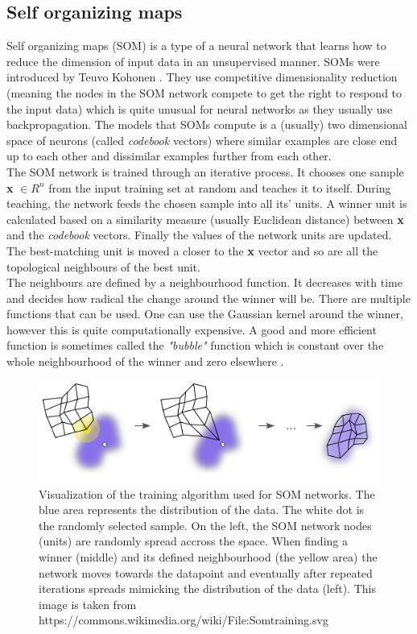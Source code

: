 \subsection{Self organizing maps}
Self organizing maps (SOM) is a type of a neural network that learns how to reduce the dimension of input data in an unsupervised manner. SOMs were introduced by Teuvo Kohonen \cite{Kohonen1982}. They use competitive dimensionality reduction (meaning the nodes in the SOM network compete to get the right to respond to the input data) which is quite unusual for neural networks as they usually use backpropagation. The models that SOMs compute is a (usually) two dimensional space of neurons (called \textit{codebook} vectors) where similar examples are close end up to each other and dissimilar examples further from each other.\\
The SOM network is trained through an iterative process. It chooses one sample \textbf{x}   \( \in R^n \) from the input training set at random and teaches it to itself. During teaching, the network feeds the chosen sample into all its' units. A winner unit is calculated based on a similarity measure (usually Euclidean distance) between \textbf{x} and the \textit{codebook} vectors. Finally the values of the network units are updated. The best-matching unit is moved a closer to the \textbf{x} vector and so are all the topological neighbours of the best unit.\\
The neighbours are defined by a neighbourhood function. It decreases with time and decides how radical the change around the winner will be. There are multiple functions that can be used. One can use the Gaussian kernel around the winner, however this is quite computationally expensive. A good and more efficient function is sometimes called the \textit{"bubble"} function which is constant over the whole neighbourhood of the winner and zero elsewhere \cite{SOM_training}.
\begin{figure}[h]
    \centering
	\includegraphics[width=140mm]{./img/Somtraining.png}
	\caption{Visualization of the training algorithm used for SOM networks. The blue area represents the distribution of the data. The white dot is the randomly selected sample. On the left, the SOM network nodes (units) are randomly spread accross the space. When finding a winner (middle) and its defined neighbourhood (the yellow area) the network moves towards the datapoint and eventually after repeated iterations spreads mimicking the distribution of the data (left). This image is taken from https://commons.wikimedia.org/wiki/File:Somtraining.svg}
	\label{fig:som_training}
\end{figure}

